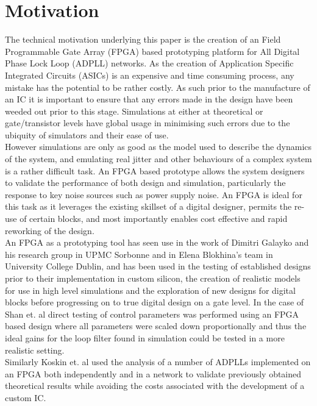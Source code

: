 \documentclass[conference]{IEEEtran}
\begin{document}
\section{Motivation}
The technical motivation underlying this paper is the creation of an Field Programmable Gate Array (FPGA) based prototyping platform for All Digital Phase Lock Loop (ADPLL) networks. As the creation of Application Specific Integrated Circuits (ASICs) is an expensive and time consuming process, any mistake has the potential to be rather costly. As such prior to the manufacture of an IC it is important to ensure that any errors made in the design have been weeded out prior to this stage.
Simulations at either at theoretical or gate/transistor levels have global usage in minimising such errors due to the ubiquity of simulators and their ease of use.\\
However simulations are only as good as the model used to describe the dynamics of the system, and emulating real jitter and other behaviours of a complex system is a rather difficult task. %
An FPGA based prototype allows the system designers to validate the performance of both design and simulation, particularly the response to key noise sources such as power supply noise. An FPGA is ideal for this task as it leverages the existing skillset of a digital designer, permits the re-use of certain blocks, and most importantly enables cost effective and rapid reworking of the design.\\
An FPGA as a prototyping tool has seen use in the work of Dimitri Galayko and his research group in UPMC Sorbonne and in Elena Blokhina's team in University College Dublin, and has been used in the testing of established designs prior to their implementation in custom silicon\cite{zianbetov2013phd,shan2014phd}, the creation of realistic models for use in high level simulations\cite{theboys2019} and the exploration of new designs for digital blocks before progressing on to true digital design on a gate level.  %
In the case of Shan et. al \cite{shan2014phd} direct testing of control parameters was performed using an FPGA based design where all parameters were scaled down proportionally and thus the ideal gains for the loop filter found in simulation could be tested in a more realistic setting.\\
Similarly Koskin et. al \cite{theboys2019} used the analysis of a number of ADPLLs implemented on an FPGA both independently and in a network to validate previously obtained theoretical results while avoiding the costs associated with the development of a custom IC.\\
\end{document}
